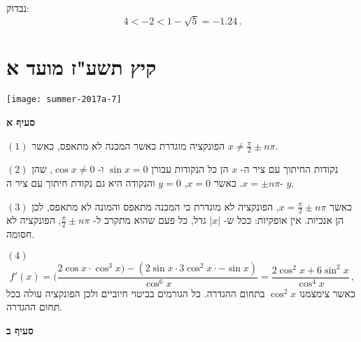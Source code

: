 נבדוק:
\[
4<-2<1-\sqrt{5}=-1.24\,.
\]


\np


\section{קיץ תשע"ז מועד א}

\begin{center}
\texttt{[image: summer-2017a-7]}
\end{center}

\vspace{-2ex}

\textbf{סעיף א}

$(1)$
הפונקציה מוגדרת כאשר המכנה לא מתאפס, כאשר 
$x \neq \frac{\pi}{2} \pm n\pi$.

$(2)$
נקודות החיתוך עם ציר ה-%
$x$
הן כל הנקודות עבורן
$\sin x = 0$
ו-%
$\cos x \neq 0$,
שהן 
$x=\pm n\pi$.
כאשר 
$x=0$,
$y=0$
והנקודה היא גם נקודת חיתוך עם ציר ה-%
$y$.

$(3)$
כאשר
$x=\frac{\pi}{2} \pm n\pi$,
הפונקציה לא מוגדרת כי המכנה מתאפס והמונה לא מתאפס, לכן הן 
\asms{}
אנכיות. אין 
\asm{}
אופקיות: ככל ש-%
$|x|$
גדל, כל פעם שהוא מתקרב ל-%
$\frac{\pi}{2} \pm n\pi$,
הפונקציה לא חסומה.

$(4)$
\[
f'(x)=(\frac{2\cos x\cdot\cos^3 x) - (2\sin x \cdot 3\cos^2 x \cdot -\sin x)}{\cos^6 x}=\frac{2\cos^2 x + 6\sin^2 x}{\cos^4 x}\,,
\]
כאשר צימצמנו 
$\cos^2 x$
בתחום ההגדרה. כל הגורמים בביטוי חיוביים ולכן הפונקציה עולה בכל תחום ההגדרה.

\np

\textbf{סעיף ב}

\begin{center}
\end{center}


